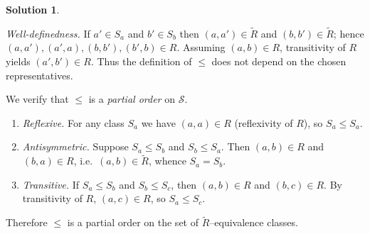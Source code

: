 \documentclass[12pt]{article}
\theoremstyle{definition} %
\newtheorem{solution}{Solution}
\theoremstyle{plain} %
\begin{document}
\begin{solution}
\begin{enumerate}[label=(\alph*)]
        \smallskip
        \emph{Well-definedness.}  
        If $a'\in S_a$ and $b'\in S_b$ then $(a,a')\in\widetilde R$ and
        $(b,b')\in\widetilde R$; hence $(a,a'),(a',a),(b,b'),(b',b)\in R$.
        Assuming $(a,b)\in R$, transitivity of $R$ yields
        \((a',b')\in R\).  
        Thus the definition of $\le$ does not depend on the chosen representatives.
        
        \bigskip
        We verify that $\le$ is a \emph{partial order} on $\mathcal{S}$.
        
        \begin{enumerate}[label=\textbf{\roman*.},wide=0pt, itemsep=4pt]
          \item \emph{Reflexive.}  
                For any class $S_a$ we have $(a,a)\in R$ (reflexivity of $R$),
                so $S_a\le S_a$.
        
          \item \emph{Antisymmetric.}  
                Suppose $S_a\le S_b$ and $S_b\le S_a$.
                Then $(a,b)\in R$ and $(b,a)\in R$, i.e.\ $(a,b)\in\widetilde R$,
                whence $S_a=S_b$.
        
          \item \emph{Transitive.}  
                If $S_a\le S_b$ and $S_b\le S_c$, then $(a,b)\in R$ and $(b,c)\in R$.
                By transitivity of $R$, $(a,c)\in R$, so $S_a\le S_c$.
        \end{enumerate}
        Therefore $\le$ is a partial order on the set of
        $\widetilde R$–equivalence classes.
        \end{enumerate}
        \end{solution}
\end{document}
